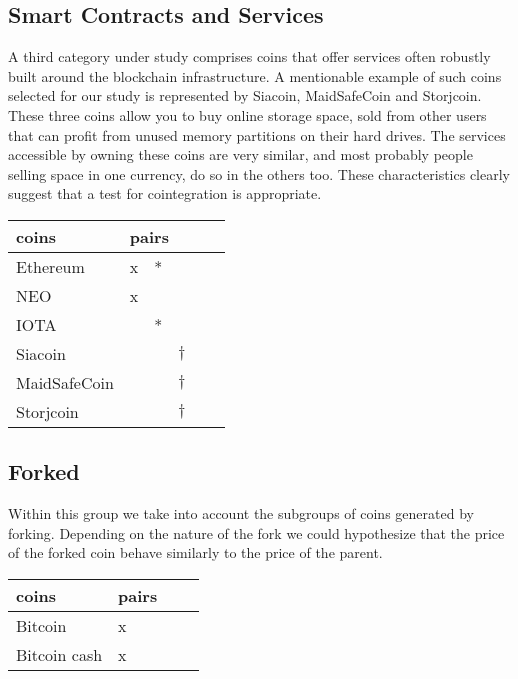 \documentclass[a4paper,11pt]{article}
\theoremstyle{remark}
\theoremstyle{plain}
\begin{document}
\subsection{Smart Contracts and Services}
A third category under study comprises coins that offer services often robustly built around the blockchain infrastructure. A mentionable example of such coins selected for our study is represented by Siacoin, MaidSafeCoin and Storjcoin. These three coins allow you to buy online storage space, sold from other users that can profit from unused memory partitions on their hard drives. The services accessible by owning these coins are very similar, and most probably people selling space in one currency, do so in the others too. These characteristics clearly suggest that a test for cointegration is appropriate.

\begin{table}[h]
\centering
\begin{tabular}{l|lllll}
coins & \multicolumn{5}{l}{pairs} \\ \hline \hline
Ethereum     & x    &  *   &     &     &    \\ \hline
  NEO    &   x  &     &     &     &    \\ \hline
  IOTA    &     &  *   &     &     &    \\ \hline
  Siacoin    &     &     &  $\dagger$   &     &    \\ \hline
  MaidSafeCoin    &     &     &  $\dagger$   &     &    \\ \hline
   Storjcoin  &     &     &  $\dagger$   &     &   
\end{tabular}
\end{table}

\subsection{Forked}
Within this group we take into account the subgroups of coins generated by forking. Depending on the nature of the fork we could hypothesize that the price of the forked coin behave similarly to the price of the parent.

\begin{table}[h]
\centering
\begin{tabular}{l|lllll}
coins & \multicolumn{5}{l}{pairs} \\ \hline \hline
Bitcoin      &  x   &     &     &     &    \\ \hline
Bitcoin cash     & x    &     &     &     &    
\end{tabular}
\end{table}
\end{document}
